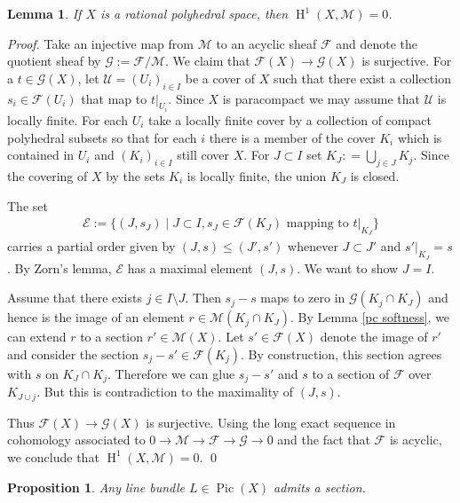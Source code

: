 \documentclass[11pt]{article}
\numberwithin{equation}{numsection}
\newcommand{\FS}{\mathcal{F}}
\newcommand{\GS}{\mathcal{G}}
\newcommand{\US}{\mathcal{U}}
\newcommand{\ES}{\mathcal{E}}
\newcommand{\MS}{\mathcal{M}}
\DeclareMathOperator{\Pic}{Pic}
\DeclareMathOperator{\HH}{H}
\newtheorem{proposition}[thm]{Proposition}
\newtheorem{lemma}[thm]{Lemma}
\begin{document}
\begin{lemma}\label{prop:vanishingH1M}
If $X$ is a rational polyhedral space, then 
$\HH^{1}(X, \MS) = 0$. 
\end{lemma}

\begin{proof}
Take an injective map from  $\MS$ to an acyclic sheaf $\FS$ and  denote the quotient sheaf by $\GS := \FS / \MS$.  
We claim that $\FS(X) \to \GS(X)$ is surjective. 
For a  $t \in \GS(X)$, let $\US = (U_i)_{i \in I}$ be a cover of $X$ such that there exist a collection   $s_i \in \FS(U_i)$ that map to $t \vert_{U_i}$. 
Since $X$ is paracompact we may assume that $\US$ is locally finite. 
For each $U_i$ take  a locally finite cover by a collection of compact polyhedral subsets so that for each $i$ 
there is a member of the cover $K_i$ which is contained in $U_i$ and $(K_i)_{i \in I}$ still cover $X$.  
For $J \subset I$ set  $K_J \colon = \bigcup_{j \in J} K_j$. 
Since the covering of $X$ by the sets $K_i$ is locally finite, the union $K_J$ is closed.

The set
\begin{align*}
\ES := \{ (J, s_J) \mid J \subset I, s_J \in \FS(K_J) \text{ mapping to } t \vert_{K_J} \}
\end{align*}
carries a  partial order given by $(J, s) \leq (J', s')$ whenever $J \subset J'$ and $s'|_{K_{J}} = s$. 
By Zorn's lemma, $\ES$ has a maximal element $(J,s)$. 
We want to show $J=I$.

Assume that there exists $j \in I \setminus J$. 
Then $s_j - s$ maps to zero in $\GS(K_j \cap K_J)$
and hence is the image of an element $r \in \MS(K_j \cap K_J)$.
By Lemma \ref{pc softness}, we can extend $r$ to a section $r' \in \MS(X)$.
Let $s' \in \FS(X)$ denote the image of $r'$ and 
consider the section $s_j - s' \in \FS(K_j)$. 
By construction, this section agrees with $s$  on $K_{J} \cap K_j$. 
Therefore we can glue $s_j - s'$ and $s$ to a section of $\FS$ over $K_{J \cup j}$. But this is contradiction 
to the maximality of $(J,s)$.

Thus $\FS(X) \to \GS(X)$ is surjective. Using the long exact sequence in cohomology associated to
$0 \to \MS \to \FS \to \GS \to 0$ and the fact that $\FS$ is acyclic, we conclude that $\HH^1(X, \MS) = 0$. 
\qed
\end{proof}

\begin{proposition}\label{prop:sec}
Any line bundle $L \in \Pic(X)$ admits a section.
\end{proposition}
\end{document}
